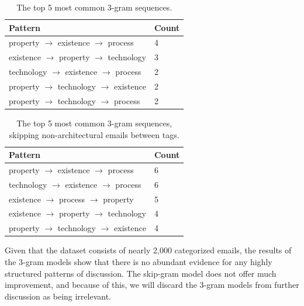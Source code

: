\documentclass[a4paper, 12pt]{article}
\begin{document}
		\begin{table}[H]
			\centering
			\caption{The top 5 most common 3-gram sequences.}
			\begin{tabular}{|l|l|}
				\hline
				\textbf{Pattern} & \textbf{Count} \\ \hline
				property $ \rightarrow $ existence $ \rightarrow $ process & 4 \\ \hline
				existence $ \rightarrow $ property $ \rightarrow $ technology & 3 \\ \hline
				technology $ \rightarrow $ existence $ \rightarrow $ process & 2 \\ \hline
				property $ \rightarrow $ technology $ \rightarrow $ existence & 2 \\ \hline
				property $ \rightarrow $ technology $ \rightarrow $ process & 2 \\ \hline
			\end{tabular}
		\end{table}
		
		\begin{table}[H]
			\centering
			\caption{The top 5 most common 3-gram sequences, skipping non-architectural emails between tags.}
			\begin{tabular}{|l|l|}
				\hline
				\textbf{Pattern} & \textbf{Count} \\ \hline
				property $ \rightarrow $ existence $ \rightarrow $ process & 6 \\ \hline
				technology $ \rightarrow $ existence $ \rightarrow $ process & 6 \\ \hline
				existence $ \rightarrow $ process $ \rightarrow $ property & 5 \\ \hline
				existence $ \rightarrow $ property $ \rightarrow $ technology & 4 \\ \hline
				property $ \rightarrow $ technology $ \rightarrow $ existence & 4 \\ \hline
			\end{tabular}
		\end{table}
	
		Given that the dataset consists of nearly 2,000 categorized emails, the results of the 3-gram models show that there is no abundant evidence for any highly structured patterns of discussion. The skip-gram model does not offer much improvement, and because of this, we will discard the 3-gram models from further discussion as being irrelevant.
	
\end{document}
